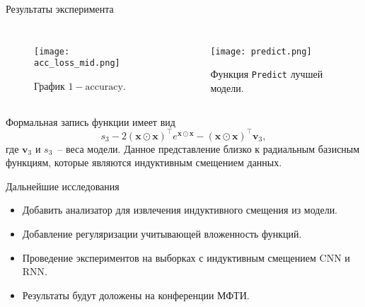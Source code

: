 \documentclass{beamer}
\begin{document}
\begin{frame}{Результаты эксперимента}
\begin{columns}[c]
\begin{figure}
    \texttt{[image: acc\_loss\_mid.png]}
    \caption{График \(1 - \text{accuracy}\).}
\end{figure}
\begin{figure}
    \texttt{[image: predict.png]}
    \caption{Функция \texttt{Predict} лучшей модели.}
\end{figure}
\end{columns}
Формальная запись функции имеет вид
\[
    s_3 - 2(\mathbf{x} \odot \mathbf{x})^{\intercal}e^{\mathbf{x} \odot \mathbf{x}} - (\mathbf{x} \odot \mathbf{x})^{\intercal} \mathbf{v}_3,
\]
где \(\mathbf{v}_3\) и \(s_3\)~-- веса модели. Данное представление близко к радиальным базисным функциям, которые являются индуктивным смещением данных.
\end{frame}
\begin{frame}{Дальнейшие исследования}
\begin{itemize}
    \item Добавить анализатор для извлечения индуктивного смещения из модели.
    \item Добавление регуляризации учитывающей вложенность функций.
    \item Проведение экспериментов на выборках с индуктивным смещением CNN и RNN.
    \item Результаты будут доложены на конференции МФТИ.
\end{itemize}
\end{frame}
%     
%     
\end{document}

